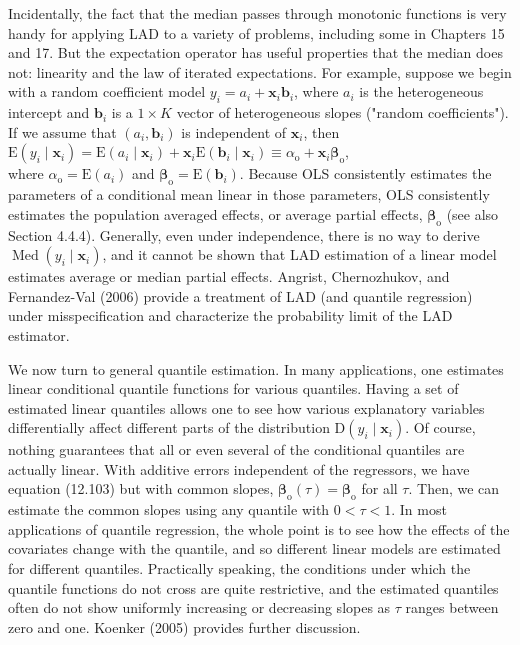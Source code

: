 \documentclass[10pt]{article}
\begin{document}
Incidentally, the fact that the median passes through monotonic functions is very handy for applying LAD to a variety of problems, including some in Chapters 15 and 17. But the expectation operator has useful properties that the median does not: linearity and the law of iterated expectations. For example, suppose we begin with a random coefficient model $y_{i}=a_{i}+\mathbf{x}_{i} \mathbf{b}_{i}$, where $a_{i}$ is the heterogeneous intercept and $\mathbf{b}_{i}$ is a $1 \times K$ vector of heterogeneous slopes ("random coefficients"). If we assume that $\left(a_{i}, \mathbf{b}_{i}\right)$ is independent of $\mathbf{x}_{i}$, then\\
$\mathrm{E}\left(y_{i} \mid \mathbf{x}_{i}\right)=\mathrm{E}\left(a_{i} \mid \mathbf{x}_{i}\right)+\mathbf{x}_{i} \mathrm{E}\left(\mathbf{b}_{i} \mid \mathbf{x}_{i}\right) \equiv \alpha_{\mathrm{o}}+\mathbf{x}_{i} \boldsymbol{\beta}_{\mathrm{o}}$,\\
where $\alpha_{\mathrm{o}}=\mathrm{E}\left(a_{i}\right)$ and $\boldsymbol{\beta}_{\mathrm{o}}=\mathrm{E}\left(\mathbf{b}_{i}\right)$. Because OLS consistently estimates the parameters of a conditional mean linear in those parameters, OLS consistently estimates the population averaged effects, or average partial effects, $\boldsymbol{\beta}_{\mathrm{o}}$ (see also Section 4.4.4). Generally, even under independence, there is no way to derive $\operatorname{Med}\left(y_{i} \mid \mathbf{x}_{i}\right)$, and it cannot be shown that LAD estimation of a linear model estimates average or median partial effects. Angrist, Chernozhukov, and Fernandez-Val (2006) provide a treatment of LAD (and quantile regression) under misspecification and characterize the probability limit of the LAD estimator.

We now turn to general quantile estimation. In many applications, one estimates linear conditional quantile functions for various quantiles. Having a set of estimated linear quantiles allows one to see how various explanatory variables differentially affect different parts of the distribution $\mathrm{D}\left(y_{i} \mid \mathbf{x}_{i}\right)$. Of course, nothing guarantees that all or even several of the conditional quantiles are actually linear. With additive errors independent of the regressors, we have equation (12.103) but with common slopes, $\boldsymbol{\beta}_{\mathrm{o}}(\tau)=\boldsymbol{\beta}_{\mathrm{o}}$ for all $\tau$. Then, we can estimate the common slopes using any quantile with $0<\tau<1$. In most applications of quantile regression, the whole point is to see how the effects of the covariates change with the quantile, and so different linear models are estimated for different quantiles. Practically speaking, the conditions under which the quantile functions do not cross are quite restrictive, and the estimated quantiles often do not show uniformly increasing or decreasing slopes as $\tau$ ranges between zero and one. Koenker (2005) provides further discussion.
\end{document}
